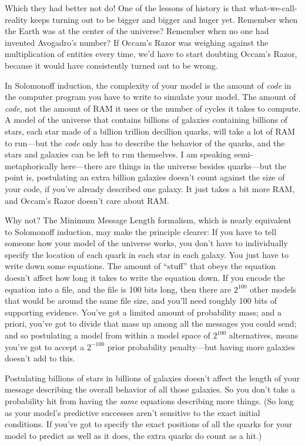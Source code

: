 {
 Which they had better not do! One of the lessons of history is
that what-we-call-reality keeps turning out to be bigger and bigger and
huger yet. Remember when the Earth was at the center of the universe?
Remember when no one had invented Avogadro's number? If
Occam's Razor was weighing against the multiplication
of entities every time, we'd have to start doubting
Occam's Razor, because it would have consistently
turned out to be wrong.}

{
 In Solomonoff induction, the complexity of your model is the
amount of \textit{code} in the computer program you have to write to
simulate your model. The amount of \textit{code}, not the amount of RAM
it uses or the number of cycles it takes to compute. A model of the
universe that contains billions of galaxies containing billions of
stars, each star made of a billion trillion decillion quarks, will take
a lot of RAM to run---but the \textit{code} only has to describe the
behavior of the quarks, and the stars and galaxies can be left to run
themselves. I am speaking semi-metaphorically here---there are things
in the universe besides quarks---but the point is, postulating an extra
billion galaxies doesn't count against the size of your
code, if you've already described one galaxy. It just
takes a bit more RAM, and Occam's Razor
doesn't care about RAM.}

{
 Why not? The Minimum Message Length formalism, which is nearly
equivalent to Solomonoff induction, may make the principle clearer: If
you have to tell someone how your model of the universe works, you
don't have to individually specify the location of each
quark in each star in each galaxy. You just have to write down some
equations. The amount of ``stuff''
that obeys the equation doesn't affect how long it
takes to write the equation down. If you encode the equation into a
file, and the file is 100 bits long, then there are
$2^{100}$ other models that would be around the same file
size, and you'll need roughly 100 bits of supporting
evidence. You've got a limited amount of probability
mass; and a priori, you've got to divide that mass up
among all the messages you could send; and so postulating a model from
within a model space of $2^{100}$ alternatives, means
you've got to accept a $2^{-100}$ prior
probability penalty---but having more galaxies doesn't
add to this.}

{
 Postulating billions of stars in billions of galaxies
doesn't affect the length of your message describing
the overall behavior of all those galaxies. So you
don't take a probability hit from having the
\textit{same} equations describing more things. (So long as your
model's predictive successes aren't
sensitive to the exact initial conditions. If you've
got to specify the exact positions of all the quarks for your model to
predict as well as it does, the extra quarks do count as a hit.)}

